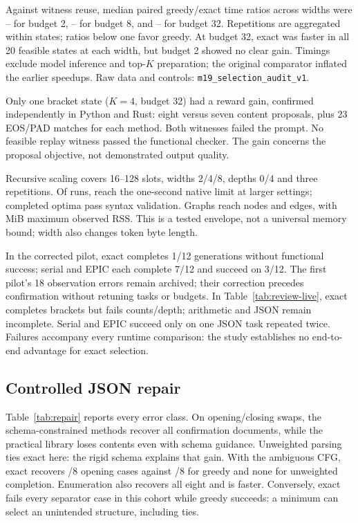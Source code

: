 Against witness reuse, median paired greedy/exact time ratios across widths were \MAuditTwoMin{}--\MAuditTwoMax{} for budget 2, \MAuditEightMin{}--\MAuditEightMax{} for budget 8, and \MAuditAllMin{}--\MAuditAllMax{} for budget 32. Repetitions are aggregated within states; ratios below one favor greedy. At budget 32, exact was faster in all 20 feasible states at each width, but budget 2 showed no clear gain. Timings exclude model inference and top-$K$ preparation; the original comparator inflated the earlier speedups. Raw data and controls: \texttt{m19\_selection\_audit\_v1}.



Only one bracket state ($K=4$, budget 32) had a reward gain, confirmed independently in Python and Rust: eight versus seven content proposals, plus 23 EOS/PAD matches for each method. Both witnesses failed the prompt. No feasible replay witness passed the functional checker. The gain concerns the proposal objective, not demonstrated output quality.

Recursive scaling covers 16--128 slots, widths 2/4/8, depths 0/4 and three repetitions. Of \MReviewScalingCases{} runs, \MReviewScalingTimeouts{} reach the one-second native limit at larger settings; completed optima pass syntax validation. Graphs reach \MReviewScalingMaxNodes{} nodes and \MReviewScalingMaxEdges{} edges, with \MReviewScalingMaxMiB{} MiB maximum observed RSS. This is a tested envelope, not a universal memory bound; width also changes token byte length.



In the corrected pilot, exact completes 1/12 generations without functional success; serial and EPIC each complete 7/12 and succeed on 3/12. The first pilot's 18 observation errors remain archived; their correction precedes confirmation without retuning tasks or budgets. In Table~\ref{tab:review-live}, exact completes brackets but fails counts/depth; arithmetic and JSON remain incomplete. Serial and EPIC succeed only on one JSON task repeated twice. Failures accompany every runtime comparison: the study establishes no end-to-end advantage for exact selection.

\subsection{Controlled JSON repair}

Table~\ref{tab:repair} reports every error class. On opening/closing swaps, the schema-constrained methods recover all confirmation documents, while the practical library loses contents even with schema guidance. Unweighted parsing ties exact here: the rigid schema explains that gain. With the ambiguous CFG, exact recovers \MRepairMechanismOpeningExact{}/8 opening cases against \MRepairMechanismOpeningGreedy{}/8 for greedy and none for unweighted completion. Enumeration also recovers all eight and is faster. Conversely, exact fails every separator case in this cohort while greedy succeeds: a minimum can select an unintended structure, including ties.

